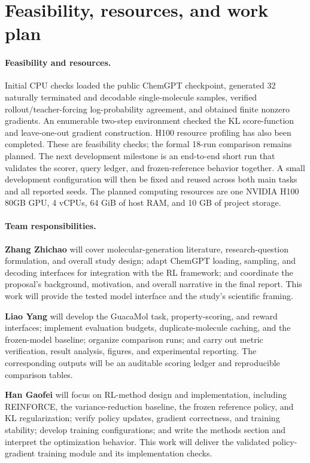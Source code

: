 \documentclass{article}
\begin{document}
\clearpage
\section{Feasibility, resources, and work plan}
\paragraph{Feasibility and resources.}
Initial CPU checks loaded the public ChemGPT checkpoint, generated 32 naturally
terminated and decodable single-molecule samples, verified rollout/teacher-forcing
log-probability agreement, and obtained finite nonzero gradients. An enumerable
two-step environment checked the KL score-function and leave-one-out gradient
construction. H100 resource profiling has also been completed. These are
feasibility checks; the formal 18-run comparison remains planned. The next
development milestone is an end-to-end short run that validates the scorer,
query ledger, and frozen-reference behavior together. A small development
configuration will then be fixed and reused across both main tasks and all
reported seeds.
The planned computing resources are one NVIDIA H100 80GB GPU, 4 vCPUs,
64 GiB of host RAM, and 10 GB of project storage.

\paragraph{Team responsibilities.}
\textbf{Zhang Zhichao} will cover molecular-generation literature, research-question
formulation, and overall study design; adapt ChemGPT loading, sampling, and
decoding interfaces for integration with the RL framework; and coordinate the
proposal's background, motivation, and overall narrative in the final report.
This work will provide the tested model interface and the study's scientific
framing.

\textbf{Liao Yang} will develop the GuacaMol task, property-scoring, and reward
interfaces; implement evaluation budgets, duplicate-molecule caching, and the
frozen-model baseline; organize comparison runs; and carry out metric
verification, result analysis, figures, and experimental reporting. The
corresponding outputs will be an auditable scoring ledger and reproducible
comparison tables.

\textbf{Han Gaofei} will focus on RL-method design and implementation, including
REINFORCE, the variance-reduction baseline, the frozen reference policy, and KL
regularization; verify policy updates, gradient correctness, and training
stability; develop training configurations; and write the methods section and
interpret the optimization behavior. This work will deliver the validated
policy-gradient training module and its implementation checks.
\end{document}

